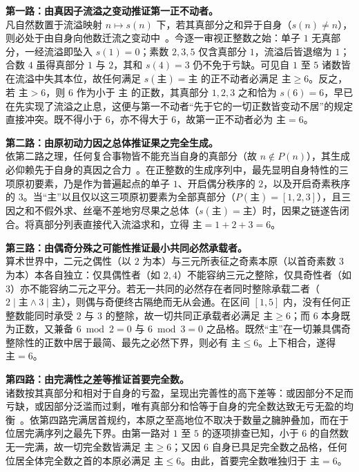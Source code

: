 \documentclass[11pt,a4paper]{ctexart}
\begin{document}
\noindent\textbf{第一路：由真因子流溢之变动推证第一正不动者。}\\
凡自然数置于流溢映射 $n \mapsto s(n)$ 下，若其真部分之和异于自身（$s(n) \neq n$），则必处于由自身向他数迁流之变动中~\cite{aquinas,physics}。今逐一审视正整数之始：单子 $1$ 无真部分，一经流溢即坠入 $s(1)=0$；素数 $2, 3, 5$ 仅含真部分 $1$，流溢后皆退缩为 $1$；合数 $4$ 虽得真部分 $1$ 与 $2$，其和 $s(4)=3$ 仍不免于亏缺。可见自 $1$ 至 $5$ 诸数皆在流溢中失其本位，故任何满足 $s(\text{主})=\text{主}$ 的正不动者必满足 $\text{主} \ge 6$。反之，若 $\text{主} > 6$，则 $6$ 作为小于 $\text{主}$ 的正数，其真部分 $1, 2, 3$ 之和恰为 $s(6)=6$，早已在先实现了流溢之止息，这便与第一不动者``先于它的一切正数皆变动不居''的规定直接冲突。既不得小于 $6$，亦不得大于 $6$，故第一正不动者必为 $\text{主}=6$。

\medskip
\noindent\textbf{第二路：由原初动力因之总体推证果之完全生成。}\\
依第二路之理，任何复合事物皆不能充当自身的真部分（故 $n \notin P(n)$），其生成必仰赖先于自身的真因之合力~\cite{aquinas,metaphysics}。在正整数的生成序列中，最先显明自身特性的三项原初要素，乃是作为普遍起点的单子 $1$、开启偶分秩序的 $2$，以及开启奇素秩序的 $3$。当``主''以且仅以这三项原初要素为全部真部分（$P(\text{主})=[1, 2, 3]$），且三因之和不假外求、丝毫不差地穷尽果之总体（$s(\text{主})=\text{主}$）时，因果之链遂告闭合。将真部分列表直接代入流溢求和，立得 $\text{主} = 1 + 2 + 3 = 6$。

\medskip
\noindent\textbf{第三路：由偶奇分殊之可能性推证最小共同必然承载者。}\\
算术世界中，二元之偶性（以 $2$ 为本）与三元所表征之奇素本原（以首奇素数 $3$ 为本）本各自独立：仅具偶性者（如 $2, 4$）不能容纳三元之整除，仅具奇性者（如 $3$）亦不能容纳二元之平分。若无一共同的必然存在者同时整除承载二者（$2 \mid \text{主} \land 3 \mid \text{主}$），则偶与奇便终古隔绝而无从会通。在区间 $[1, 5]$ 内，没有任何正整数能同时承受 $2$ 与 $3$ 的整除，故一切共同正承载者必满足 $\text{主} \ge 6$；而 $6$ 本身既为正数，又兼备 $6 \bmod 2 = 0$ 与 $6 \bmod 3 = 0$ 之品格。既然``主''在一切兼具偶奇整除性的正数中居于最简、最先之必然下界，则必有 $\text{主} \le 6$。上下相合，遂得 $\text{主}=6$。

\medskip
\noindent\textbf{第四路：由完满性之差等推证首要完全数。}\\
诸数按其真部分和相对于自身的亏盈，呈现出完善性的高下差等：或因部分不足而亏缺，或因部分泛滥而过剩，唯有真部分和恰等于自身的完全数达致无亏无盈的均衡~\cite{aquinas,augustine}。依第四路完满居首规约，本原之至高地位不取决于数量之臃肿叠加，而在于位居完满序列之最先下界。由第一路对 $1$ 至 $5$ 的逐项排查已知，小于 $6$ 的自然数无一完满，故一切完全数皆满足 $\text{主} \ge 6$；又因 $6$ 自身已具足完全数之品格，任何位居全体完全数之首的本原必满足 $\text{主} \le 6$。由此，首要完全数唯独归于 $\text{主}=6$。
\end{document}
